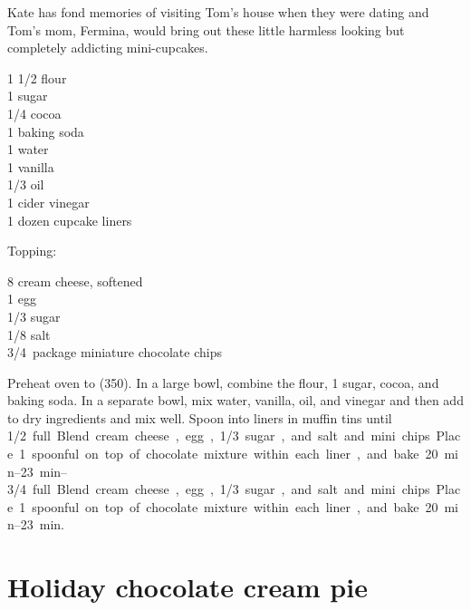 \begin{open}
    Kate has fond memories of visiting Tom's house when they were dating and Tom's mom, Fermina, would bring out these little harmless looking but completely addicting mini-cupcakes.
\end{open}
\begin{ingredients}
    1 \SI{1/2}{\cup} flour\\
    \SI{1}{\cup} sugar\\
    \SI{1/4}{\cup} cocoa\\
    \SI{1}{\teaspoon} baking soda\\
    \SI{1}{\cup} water\\
    \SI{1}{\teaspoon} vanilla\\
    \SI{1/3}{\cup} oil\\
    \SI{1}{\tblspoon} cider vinegar\\
    1 dozen cupcake liners\\
\end{ingredients}
    
Topping:
\begin{ingredients}
    \SI{8}{\ounce} cream cheese, softened\\
    1 egg\\
    \SI{1/3}{\cup} sugar\\
    \SI{1/8}{\teaspoon} salt\\
    \SI{3/4}{package} miniature chocolate chips\\
\end{ingredients}

Preheat oven to (\SI{350}{\degreeF}). In a large bowl, combine the flour, \SI{1}{\cup} sugar, cocoa, and baking soda. In a separate bowl, mix water, vanilla, oil, and vinegar and then add to dry ingredients and mix well. Spoon into liners in muffin tins until \SIrange{1/2}{3/4} full. Blend cream cheese, egg, \SI{1/3}{\cup} sugar, and salt and mini chips. Place 1 spoonful on top of chocolate mixture within each liner, and bake \SIrange{20}{23}{\minute}.

\section{Holiday chocolate cream pie}

